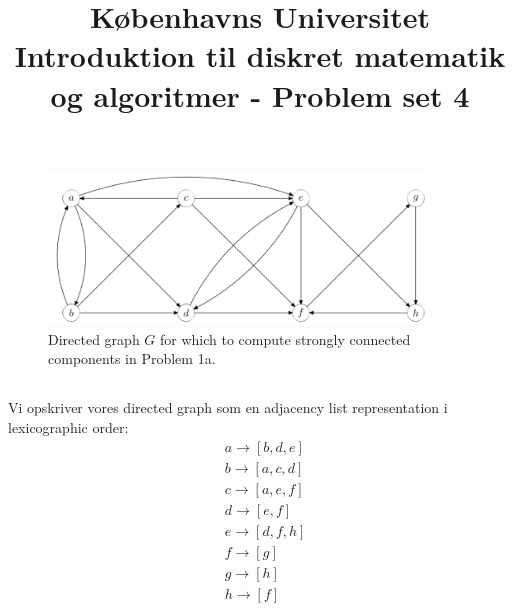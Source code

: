 \documentclass[a4paper,12pt]{article}
\begin{document}
% 

\title{Københavns Universitet\\
Introduktion til diskret matematik og algoritmer - Problem set 4}
\maketitle %



\section[Question 1]{}
\begin{figure}[H]
    \centering
    \includegraphics[width=0.9\textwidth]{1.png}
    \caption{Directed graph $G$ for which to compute strongly connected components in Problem 1a.}
\end{figure}

\subsection[]{}
Vi opskriver vores directed graph som en adjacency list representation i lexicographic order:
\[
\begin{aligned}
&a \rightarrow [b, d, e]\\
&b \rightarrow [a, c, d]\\
&c \rightarrow [a, e, f]\\
&d \rightarrow [e, f]\\
&e \rightarrow [d, f, h]\\
&f \rightarrow [g]\\
&g \rightarrow [h]\\
&h \rightarrow [f]\\
\end{aligned}
\]
\end{document}
